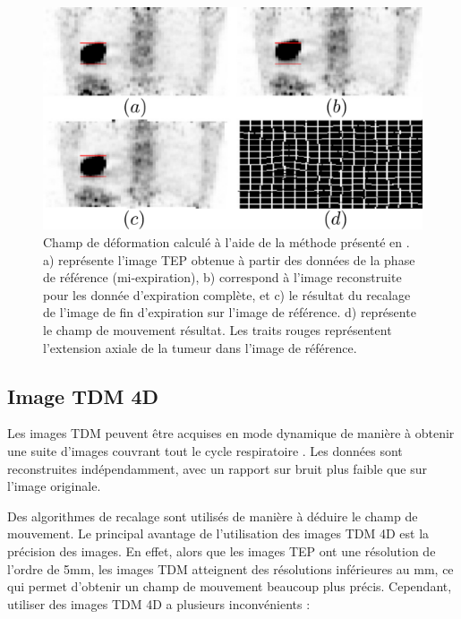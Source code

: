\begin{figure}[h!]
	\begin{center}
		\includegraphics[width=12cm]{images/champDeformBai2}
	\end{center}
	\caption{Champ de déformation calculé à l'aide de la méthode présenté en \cite{bai2009regularized}. a) représente l'image TEP obtenue à partir des données de la phase de référence  (mi-expiration), b) correspond à l'image reconstruite pour les donnée d'expiration complète, et c) le résultat du recalage de l'image de fin d'expiration sur l'image de référence. d) représente le champ de mouvement résultat. Les traits rouges représentent l'extension axiale de la tumeur dans l'image de référence.} 
	\label{fig:champMouvementBai}
\end{figure}

\subsection{Image TDM 4D}

Les images TDM peuvent être acquises en mode dynamique de manière à obtenir une suite d'images couvrant tout le cycle respiratoire \cite{lamare2007list, qiao2006motion}. Les données sont reconstruites indépendamment, avec un rapport sur bruit plus faible que sur l'image originale. 

Des algorithmes de recalage sont utilisés de manière à déduire le champ de mouvement. Le principal avantage de l'utilisation des images TDM 4D est la précision des images. En effet, alors que les images TEP ont une résolution de l'ordre de 5mm, les images TDM atteignent des résolutions inférieures au mm, ce qui permet d'obtenir un champ de mouvement beaucoup plus précis. Cependant, utiliser des images TDM 4D a plusieurs inconvénients :

